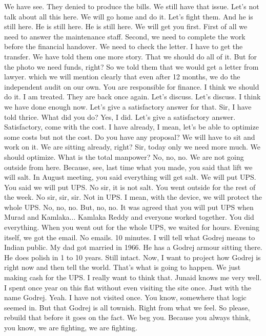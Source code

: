 We have see.
They denied to produce the bills.
We still have that issue.
Let's not talk about all this here.
We will go home and do it.
Let's fight them.
And he is still here.
He is still here.
He is still here.
We will get you first.
First of all we need to answer the maintenance staff.
Second, we need to complete the work before the financial handover.
We need to check the letter.
I have to get the transfer.
We have told them one more story.
That we should do all of it.
But for the photo we need funds, right?
So we told them that we would get a letter from lawyer.
which we will mention clearly that even after 12 months, we do the independent audit on our own.
You are responsible for finance.
I think we should do it.
I am treated.
They are back once again. Let's discuss.
Let's discuss.
I think we have done enough now.
Let's give a satisfactory answer for that.
Sir, I have told thrice.
What did you do?
Yes, I did.
Let's give a satisfactory answer.
Satisfactory, come with the cost.
I have already, I mean, let's be able to optimize some costs but not the cost.
Do you have any proposal?
We will have to sit and work on it.
We are sitting already, right?
Sir, today only we need more much. We should optimize.
What is the total manpower?
No, no, no.
We are not going outside from here.
Because, see, last time what you made, you said that lift we will salt.
In August meeting, you said everything will get salt.
We will put UPS.
You said we will put UPS.
No sir, it is not salt.
You went outside for the rest of the week.
No sir, sir, sir.
Not in UPS.
I mean, with the device, we will protect the whole UPS.
No, no, no.
But, no, no.
It was agreed that you will put UPS when Murad and Kamlaka...
Kamlaka Reddy and everyone worked together.
You did everything.
When you went out for the whole UPS, we waited for hours.
Evening itself, we got the email.
No emails.
10 minutes.
I will tell what Godrej means to Indian public.
My dad got married in 1966.
He has a Godrej armour sitting there.
He does polish in 1 to 10 years.
Still intact.
Now, I want to project how Godrej is right now and then tell the world.
That's what is going to happen.
We just making cash for the UPS.
I really want to think that.
Junaid knows me very well.
I spent once year on this flat without even visiting the site once.
Just with the name Godrej.
Yeah.
I have not visited once.
You know, somewhere that logic seemed in.
But that Godrej is all townish.
Right from what we feel.
So please, rebuild that before it goes on the fact.
We beg you.
Because you always think, you know, we are fighting, we are fighting.
